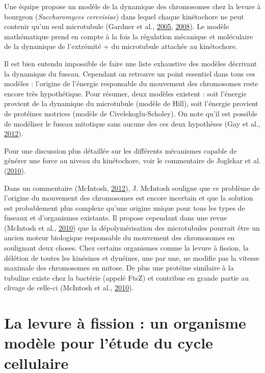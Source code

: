 \documentclass[12pt,a4paper,twoside,openright]{book}
\begin{document}
Une équipe propose un modèle de la dynamique des chromosomes chez la
levure à bourgeon (\emph{Saccharomyces cerevisiae}) dans lequel chaque
kinétochore ne peut contenir qu'un seul microtubule (Gardner et al.,
\hyperref[ref-Gardner2005]{2005}, \hyperref[ref-Gardner2008a]{2008}). Le
modèle mathématique prend en compte à la fois la régulation mécanique et
moléculaire de la dynamique de l'extrémité + du microtubule attachée au
kinétochore.

Il est bien entendu impossible de faire une liste exhaustive des modèles
décrivant la dynamique du fuseau. Cependant on retrouve un point
essentiel dans tous ces modèles : l'origine de l'énergie responsable du
mouvement des chromosomes reste encore très hypothétique. Pour résumer,
deux modèles existent : soit l'énergie provient de la dynamique du
microtubule (modèle de Hill), soit l'énergie provient de protéines
motrices (modèle de Civelekoglu-Scholey). On note qu'il est possible de
modéliser le fuseau mitotique sans aucune des ces deux hypothèses (Gay
et al., \hyperref[ref-Gay2012a]{2012}).

Pour une discussion plus détaillée sur les différents mécanismes capable
de générer une force au niveau du kinétochore, voir le commentaire de
Joglekar et al. (\hyperref[ref-Joglekar2010a]{2010}).

Dans un commentaire (McIntosh, \hyperref[ref-McIntosh2012]{2012}), J.
McIntosh souligne que ce problème de l'origine du mouvement des
chromosomes est encore incertain et que la solution est probablement
plus complexe qu'une origine unique pour tous les types de fuseaux et
d'organismes existants. Il propose cependant dans une revue (McIntosh et
al., \hyperref[ref-McIntosh2010]{2010}) que la dépolymérisation des
microtubules pourrait être un ancien moteur biologique responsable du
mouvement des chromosomes en soulignant deux choses. Chez certains
organismes comme la levure à fission, la délétion de toutes les
kinésines et dynéines, une par une, ne modifie pas la vitesse maximale
des chromosomes en mitose. De plus une protéine similaire à la tubuline
existe chez la bactérie (appelé FtsZ) et contribue en grande partie au
clivage de celle-ci (McIntosh et al.,
\hyperref[ref-McIntosh2010]{2010}).

\section{La levure à fission : un organisme modèle pour l'étude du cycle
cellulaire}\label{la-levure-uxe0-fission-un-organisme-moduxe8le-pour-luxe9tude-du-cycle-cellulaire}
\end{document}
